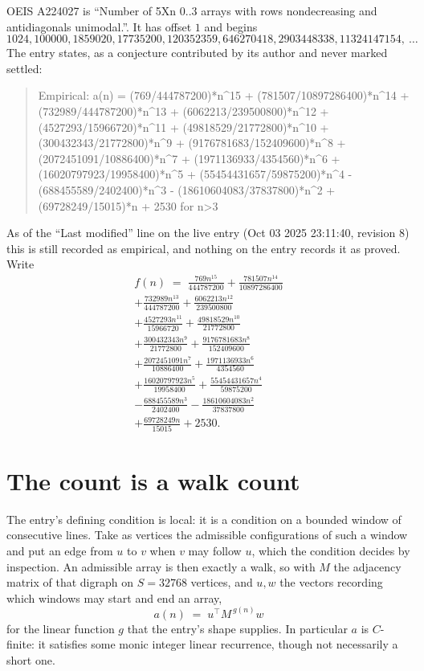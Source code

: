 \documentclass[11pt,a4paper]{article}
\theoremstyle{plain}
\theoremstyle{definition}
\begin{document}
OEIS A224027 is ``Number of 5Xn 0..3 arrays with rows nondecreasing and antidiagonals unimodal.''. It has offset $1$ and begins
\[
1024, 100000, 1859020, 17735200, 120352359, 646270418, 2903448338, 11324147154,\ \dots
\]
The entry states, as a conjecture contributed by its author and never marked settled:
\begin{quote}\raggedright\small
Empirical: a(n) = (769/444787200)*n\^{}15 + (781507/10897286400)*n\^{}14 + (732989/444787200)*n\^{}13 + (6062213/239500800)*n\^{}12 + (4527293/15966720)*n\^{}11 + (49818529/21772800)*n\^{}10 + (300432343/21772800)*n\^{}9 + (9176781683/152409600)*n\^{}8 + (2072451091/10886400)*n\^{}7 + (1971136933/4354560)*n\^{}6 + (16020797923/19958400)*n\^{}5 + (55454431657/59875200)*n\^{}4 - (688455589/2402400)*n\^{}3 - (18610604083/37837800)*n\^{}2 + (69728249/15015)*n + 2530 for n>3
\end{quote}
As of the ``Last modified'' line on the live entry (Oct 03 2025 23:11:40, revision 8) this is still
recorded as empirical, and nothing on the entry records it as proved. Write
\begin{multline*}
f(n)\;=\;\frac{769 n^{15}}{444787200} + \frac{781507 n^{14}}{10897286400} \\
+ \frac{732989 n^{13}}{444787200} + \frac{6062213 n^{12}}{239500800} \\
+ \frac{4527293 n^{11}}{15966720} + \frac{49818529 n^{10}}{21772800} \\
+ \frac{300432343 n^{9}}{21772800} + \frac{9176781683 n^{8}}{152409600} \\
+ \frac{2072451091 n^{7}}{10886400} + \frac{1971136933 n^{6}}{4354560} \\
+ \frac{16020797923 n^{5}}{19958400} + \frac{55454431657 n^{4}}{59875200} \\
- \frac{688455589 n^{3}}{2402400} - \frac{18610604083 n^{2}}{37837800} \\
+ \frac{69728249 n}{15015} + 2530.
\end{multline*}

\section{The count is a walk count}

The entry's defining condition is local: it is a condition on a bounded window of consecutive lines. Take as vertices the
admissible configurations of such a window and put an edge from $u$ to $v$ when $v$ may
follow $u$, which the condition decides by inspection. An admissible array is then exactly a
walk, so with $M$ the adjacency matrix of that digraph on $S=32768$ vertices, and $u,w$ the
vectors recording which windows may start and end an array,
\[
a(n)\;=\;u^{\!\top}M^{\,g(n)}w
\]
for the linear function $g$ that the entry's shape supplies. In particular $a$ is
$C$-finite: it satisfies some monic integer linear recurrence, though not necessarily a short
one.
\end{document}
